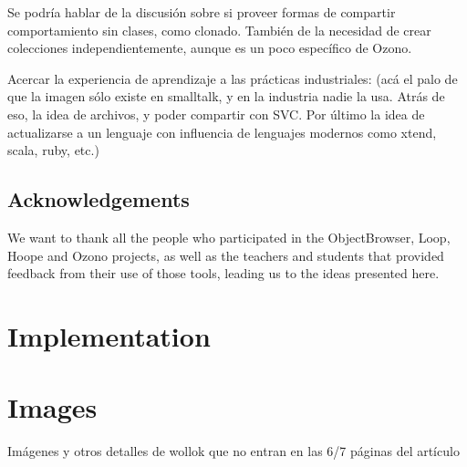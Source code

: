 \documentclass[preprint,10pt]{sigplanconf}
\begin{document}

Se podría hablar de la discusión sobre si proveer formas de compartir comportamiento sin clases, como clonado.
También de la necesidad de crear colecciones independientemente, aunque es un poco específico de Ozono.

\medskip
Acercar la experiencia de aprendizaje a las prácticas industriales: 
(acá el palo de que la imagen sólo existe en smalltalk, y en la industria nadie la usa. 
Atrás de eso, la idea de archivos, y poder compartir con SVC. Por último la idea de actualizarse a un lenguaje con influencia de lenguajes modernos como xtend, scala, ruby, etc.)






\subsection*{Acknowledgements}
We want to thank all the people who participated in the ObjectBrowser, Loop, Hoope and Ozono projects, 
as well as the teachers and students that provided feedback from their use of those tools, leading us to the ideas presented here.

{
	\small
	
	
}

\newpage
\appendix
\section{Implementation}
\label{sec:implementation}

\section{Images}
Imágenes y otros detalles de wollok que no entran en las 6/7 páginas del artículo
\end{document}
